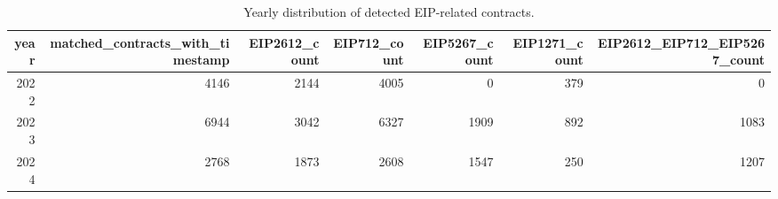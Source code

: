 \begin{table}
\caption{Yearly distribution of detected EIP-related contracts.}
\label{tab:eip-adoption-yearly}
\begin{tabular}{rrrrrrr}
\toprule
year & matched_contracts_with_timestamp & EIP2612_count & EIP712_count & EIP5267_count & EIP1271_count & EIP2612_EIP712_EIP5267_count \\
\midrule
2022 & 4146 & 2144 & 4005 & 0 & 379 & 0 \\
2023 & 6944 & 3042 & 6327 & 1909 & 892 & 1083 \\
2024 & 2768 & 1873 & 2608 & 1547 & 250 & 1207 \\
\bottomrule
\end{tabular}
\end{table}
